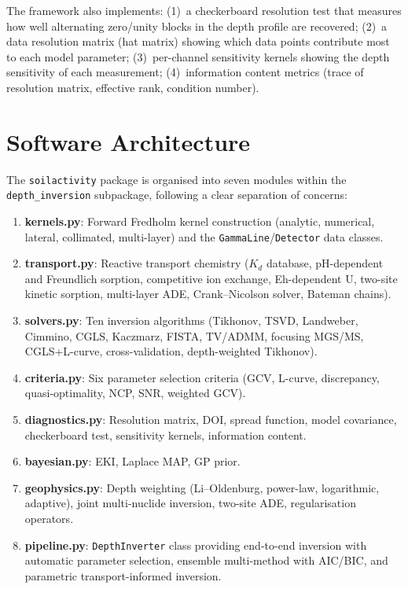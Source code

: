 \documentclass[a4paper,11pt]{article}
\begin{document}
The framework also implements:
(1)~a checkerboard resolution test that measures how well alternating
zero/unity blocks in the depth profile are recovered;
(2)~a data resolution matrix (hat matrix) showing which data points
contribute most to each model parameter;
(3)~per-channel sensitivity kernels showing the depth sensitivity of
each measurement;
(4)~information content metrics (trace of resolution matrix, effective
rank, condition number).


\section{Software Architecture}\label{sec:software}

The \texttt{soilactivity} package is organised into seven modules within
the \texttt{depth\_inversion} subpackage, following a clear separation
of concerns:

\begin{enumerate}
  \item \textbf{kernels.py}: Forward Fredholm kernel construction
  (analytic, numerical, lateral, collimated, multi-layer) and the
  \texttt{GammaLine}/\texttt{Detector} data classes.
  \item \textbf{transport.py}: Reactive transport chemistry ($K_d$
  database, pH-dependent and Freundlich sorption, competitive ion
  exchange, Eh-dependent U, two-site kinetic sorption, multi-layer
  ADE, Crank--Nicolson solver, Bateman chains).
  \item \textbf{solvers.py}: Ten inversion algorithms (Tikhonov, TSVD,
  Landweber, Cimmino, CGLS, Kaczmarz, FISTA, TV/ADMM, focusing MGS/MS,
  CGLS+L-curve, cross-validation, depth-weighted Tikhonov).
  \item \textbf{criteria.py}: Six parameter selection criteria (GCV,
  L-curve, discrepancy, quasi-optimality, NCP, SNR, weighted GCV).
  \item \textbf{diagnostics.py}: Resolution matrix, DOI, spread function,
  model covariance, checkerboard test, sensitivity kernels, information
  content.
  \item \textbf{bayesian.py}: EKI, Laplace MAP, GP prior.
  \item \textbf{geophysics.py}: Depth weighting (Li--Oldenburg, power-law,
  logarithmic, adaptive), joint multi-nuclide inversion, two-site ADE,
  regularisation operators.
  \item \textbf{pipeline.py}: \texttt{DepthInverter} class providing
  end-to-end inversion with automatic parameter selection, ensemble
  multi-method with AIC/BIC, and parametric transport-informed
  inversion.
\end{enumerate}
\end{document}
